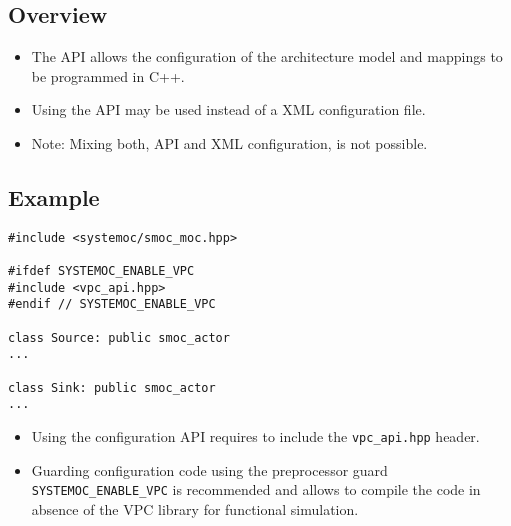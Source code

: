 \lstset{language=C++}

\subsection{Overview}

\begin{frame}[t]

\begin{itemize}
\item The API allows the configuration of the architecture model and mappings to be programmed in C++.
\item Using the API may be used instead of a XML configuration file.
\item Note: Mixing both, API and XML configuration, is not possible.
\end{itemize}

\end{frame}

\subsection{Example}


\begin{frame}[fragile=singleslide]
\begin{lstlisting}
#include <systemoc/smoc_moc.hpp>

#ifdef SYSTEMOC_ENABLE_VPC
#include <vpc_api.hpp>
#endif // SYSTEMOC_ENABLE_VPC

class Source: public smoc_actor
...

class Sink: public smoc_actor
...
\end{lstlisting}
\begin{itemize}
\item Using the configuration API requires to include the \lstinline!vpc_api.hpp! header.
\item Guarding configuration code using the preprocessor guard \lstinline!SYSTEMOC_ENABLE_VPC! is recommended and allows to compile the code in absence of the VPC library for functional simulation.
\end{itemize}
\end{frame}



